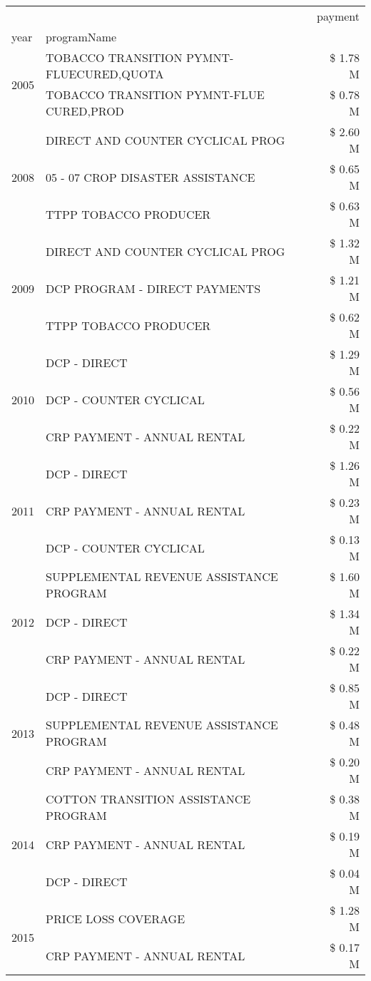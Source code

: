 \begin{tabular}{llr}
\toprule
 &  & payment \\
year & programName &  \\
\midrule
\multirow[t]{2}{*}{2005} & TOBACCO TRANSITION PYMNT-FLUECURED,QUOTA & \$ 1.78 M \\
 & TOBACCO TRANSITION PYMNT-FLUE CURED,PROD & \$ 0.78 M \\
\cline{1-3}
\multirow[t]{3}{*}{2008} & DIRECT AND COUNTER CYCLICAL PROG & \$ 2.60 M \\
 & 05 - 07 CROP DISASTER ASSISTANCE & \$ 0.65 M \\
 & TTPP TOBACCO PRODUCER & \$ 0.63 M \\
\cline{1-3}
\multirow[t]{3}{*}{2009} & DIRECT AND COUNTER CYCLICAL PROG & \$ 1.32 M \\
 & DCP PROGRAM - DIRECT PAYMENTS & \$ 1.21 M \\
 & TTPP TOBACCO PRODUCER & \$ 0.62 M \\
\cline{1-3}
\multirow[t]{3}{*}{2010} & DCP - DIRECT & \$ 1.29 M \\
 & DCP - COUNTER CYCLICAL & \$ 0.56 M \\
 & CRP PAYMENT - ANNUAL RENTAL & \$ 0.22 M \\
\cline{1-3}
\multirow[t]{3}{*}{2011} & DCP - DIRECT & \$ 1.26 M \\
 & CRP PAYMENT - ANNUAL RENTAL & \$ 0.23 M \\
 & DCP - COUNTER CYCLICAL & \$ 0.13 M \\
\cline{1-3}
\multirow[t]{3}{*}{2012} & SUPPLEMENTAL REVENUE ASSISTANCE PROGRAM & \$ 1.60 M \\
 & DCP - DIRECT & \$ 1.34 M \\
 & CRP PAYMENT - ANNUAL RENTAL & \$ 0.22 M \\
\cline{1-3}
\multirow[t]{3}{*}{2013} & DCP - DIRECT & \$ 0.85 M \\
 & SUPPLEMENTAL REVENUE ASSISTANCE PROGRAM & \$ 0.48 M \\
 & CRP PAYMENT - ANNUAL RENTAL & \$ 0.20 M \\
\cline{1-3}
\multirow[t]{3}{*}{2014} & COTTON TRANSITION ASSISTANCE PROGRAM & \$ 0.38 M \\
 & CRP PAYMENT - ANNUAL RENTAL & \$ 0.19 M \\
 & DCP - DIRECT & \$ 0.04 M \\
\cline{1-3}
\multirow[t]{3}{*}{2015} & PRICE LOSS COVERAGE & \$ 1.28 M \\
 & CRP PAYMENT - ANNUAL RENTAL & \$ 0.17 M \\

\end{tabular}
